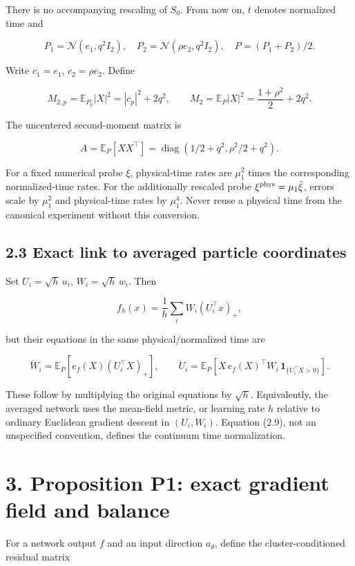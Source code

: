 \documentclass[
  10pt,
]{article}
\begin{document}
There is no accompanying rescaling of \(S_0\). From now on, \(t\)
denotes normalized time and

\[
 P_1=\mathcal N(e_1,q^2I_2),\quad
 P_2=\mathcal N(\rho e_2,q^2I_2),\quad
 P=(P_1+P_2)/2.
 \tag{2.6}
\]

Write \(c_1=e_1\), \(c_2=\rho e_2\). Define

\[
 M_{2,p}=\mathbb E_{P_p}|X|^2=|c_p|^2+2q^2,\qquad
 M_2=\mathbb E_P|X|^2=\frac{1+\rho^2}{2}+2q^2.
 \tag{2.7}
\]

The uncentered second-moment matrix is

\[
 A=\mathbb E_P[XX^\top]
 =\operatorname{diag}(1/2+q^2,\rho^2/2+q^2).
 \tag{2.8}
\]

For a fixed numerical probe \(\xi\), physical-time rates are \(\mu_1^2\)
times the corresponding normalized-time rates. For the additionally
rescaled probe \(\xi^{\rm phys}=\mu_1\bar\xi\), errors scale by
\(\mu_1^2\) and physical-time rates by \(\mu_1^4\). Never reuse a
physical time from the canonical experiment without this conversion.

\subsection{2.3 Exact link to averaged particle
coordinates}\label{exact-link-to-averaged-particle-coordinates}

Set \(U_i=\sqrt h\,u_i\), \(W_i=\sqrt h\,w_i\). Then

\[
 f_h(x)=\frac1h\sum_iW_i(U_i^\top x)_+,
\]

but their equations in the same physical/normalized time are

\[
 \dot W_i=\mathbb E_P[e_f(X)(U_i^\top X)_+],\qquad
 \dot U_i=\mathbb E_P[X\,e_f(X)^\top W_i\,\mathbf1_{\{U_i^\top X>0\}}].
 \tag{2.9}
\]

These follow by multiplying the original equations by \(\sqrt h\).
Equivalently, the averaged network uses the mean-field metric, or
learning rate \(h\) relative to ordinary Euclidean gradient descent in
\((U_i,W_i)\). Equation (2.9), not an unspecified convention, defines
the continuum time normalization.

\section{3. Proposition P1: exact gradient field and
balance}\label{proposition-p1-exact-gradient-field-and-balance}

For a network output \(f\) and an input direction \(a_\theta\), define
the cluster-conditioned residual matrix
\end{document}
